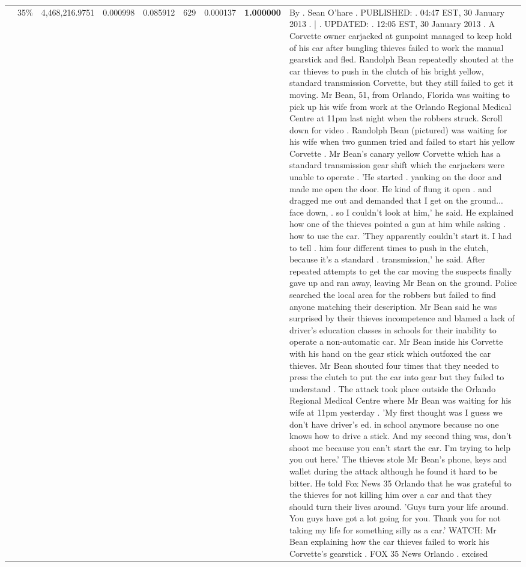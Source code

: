 \begin{table}[H]
\begin{tabular}{llrrrrrrl}
 & 35\% & 4,468,216.9751 & 0.000998 & 0.085912 & \color{red} 629 & 0.000137 & \bfseries \color{red} 1.000000 & By . Sean O'hare . PUBLISHED: . 04:47 EST, 30 January 2013 . | . UPDATED: . 12:05 EST, 30 January 2013 . A Corvette owner carjacked at gunpoint managed to keep hold of his car after bungling thieves failed to work the manual gearstick and fled. Randolph Bean repeatedly shouted at the car thieves to push in the clutch of his bright yellow, standard transmission Corvette, but they still failed to get it moving. Mr Bean, 51, from Orlando, Florida was waiting to pick up his wife from work at the Orlando Regional Medical Centre at 11pm last night when the robbers struck. Scroll down for video . Randolph Bean (pictured) was waiting for his wife when two gunmen tried and failed to start his yellow Corvette . Mr Bean's canary yellow Corvette which has a standard transmission gear shift which the carjackers were unable to operate . 'He started . yanking on the door and made me open the door. He kind of flung it open . and dragged me out and demanded that I get on the ground... face down, . so I couldn't look at him,' he said. He explained how one of the thieves pointed a gun at him while asking . how to use the car. 'They apparently couldn't start it. I had to tell . him four different times to push in the clutch, because it's a standard . transmission,' he said. After repeated attempts to get the car moving the suspects finally gave up and ran away, leaving Mr Bean on the ground. Police searched the local area for the robbers but failed to find anyone matching their description. Mr Bean said he was surprised by their thieves incompetence and blamed a lack of driver's education classes in schools for their inability to operate a non-automatic car. Mr Bean inside his Corvette with his hand on the gear stick which outfoxed the car thieves. Mr Bean shouted four times that they needed to press the clutch to put the car into gear but they failed to understand . The attack took place outside the Orlando Regional Medical Centre where Mr Bean was waiting for his wife at 11pm yesterday . 'My first thought was I guess we don't have driver's ed. in school anymore because no one knows how to drive a stick. And my second thing was, don't shoot me because you can't start the car. I'm trying to help you out here.' The thieves stole Mr Bean's phone, keys and wallet during the attack although he found it hard to be bitter. He told Fox News 35 Orlando that he was grateful to the thieves for not killing him over a car and that they should turn their lives around. 'Guys turn your life around. You guys have got a lot going for you. Thank you for not taking my life for something silly as a car.' WATCH: Mr Bean explaining how the car thieves failed to work his Corvette's gearstick . FOX 35 News Orlando . excised \\

\end{tabular}
\end{table}
